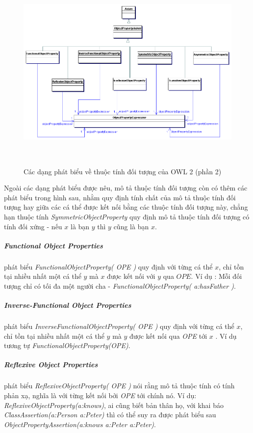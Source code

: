 	\begin{figure}[h]
		\centering
		\includegraphics[width=150mm, height=100mm]{Figures/objectpropertyAxiom1.png}
		\caption{Các dạng phát biểu về thuộc tính đối tượng của OWL 2 (phần 2) \label{overflow}}
	\end{figure}
	Ngoài các dạng phát biểu được nêu, mô tả thuộc tính đối tượng còn có thêm các phát biểu trong hình sau, nhằm quy định tính chất của mô tả thuộc tính đối tượng hay giữa các cá thể được kết nối bằng các thuộc tính đối tượng này, chẳng hạn thuộc tính\textit{ SymmetricObjectProperty} quy định mô tả thuộc tính đối tượng có tính đối xứng - nếu $x$ là bạn $y$ thì $y$ cũng là bạn $x$. 
	
	\subparagraph{Functional Object Properties} phát biểu \textit{FunctionalObjectProperty( OPE )} quy định với từng cá thể $x$, chỉ tồn tại nhiều nhất một cá thể $y$ mà $x$ được kết nối với $y$ qua $OPE$. Ví dụ : Mỗi đối tượng chỉ có tối đa một người cha - \textit{FunctionalObjectProperty( a:hasFather )}. 
	
	\subparagraph{Inverse-Functional Object Properties} phát biểu \textit{InverseFunctionalObjectProperty( OPE )} quy định với từng cá thể $x$, chỉ tồn tại nhiều nhất một cá thể $y$ mà $y$ được kết nối qua \textit{OPE} tới $x$ . Ví dụ tương tự \textit{FunctionalObjectProperty(OPE)}.
	
	\subparagraph{Reflexive Object Properties} phát biểu \textit{ReflexiveObjectProperty( OPE )} nói rằng mô tả thuộc tính có tính phản xạ, nghĩa là với từng kết nối bởi \textit{OPE} tới chính nó. Ví dụ: \textit{ReflexiveObjectProperty(a:knows)}, ai cũng biết bản thân họ, với khai báo \textit{ClassAssertion(a:Person a:Peter)} thì có thể suy ra được phát biểu sau \textit{ObjectPropertyAssertion(a:knows a:Peter a:Peter)}.
	
